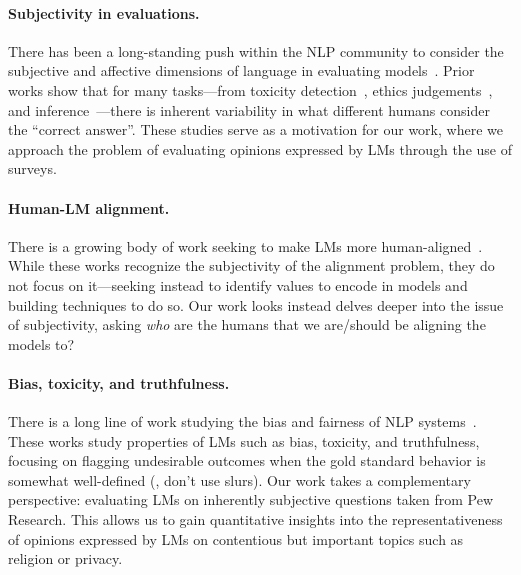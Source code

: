 \paragraph{Subjectivity in evaluations.} 
There has been a long-standing push within the NLP community to consider the subjective and affective dimensions of language in evaluating models~\citep{alm2011subjective}.
Prior works show that for many tasks---from toxicity detection~\citep{Gordon21,Gordon22,davani2022dealing,Sap22,goyal2022your}, ethics judgements~\citep{lourie2021scruples}, and inference~\citep{pavlick2019inherent}---there is inherent variability in what different humans consider the ``correct answer''.
These studies serve as a motivation for our work, where we approach the problem of evaluating opinions expressed by LMs through the use of surveys.

\paragraph{Human-LM alignment.}
There is a growing body of work seeking to make LMs more human-aligned~\citep{askell2021general,ouyang2022training,glaese2022improving,bai2022constitutional}.
While these works recognize the subjectivity of the alignment problem, they do not focus on it---seeking instead to identify values to encode in models and building techniques to do so.
Our work looks instead delves deeper into the issue of subjectivity, asking \emph{who} are the humans that we are/should be aligning the models to?




\paragraph{Bias, toxicity, and truthfulness.}
There is a long line of work studying the bias and fairness of NLP systems~\citep{nadeem2020stereoset,Dhamala21,DeArteaga19,Brown20,eval-harness,srivastava2022beyond,liang2022holistic,xu2021bot,perez2022red,ganguli2022red}. These works study properties of LMs such as bias, toxicity, and truthfulness, focusing on flagging undesirable outcomes when the gold standard behavior is somewhat well-defined (\eg, don't use slurs). Our work takes a complementary perspective: evaluating LMs on inherently subjective questions taken from Pew Research. This allows us to gain quantitative insights into the representativeness of opinions expressed by LMs on contentious but important topics such as religion or privacy.

